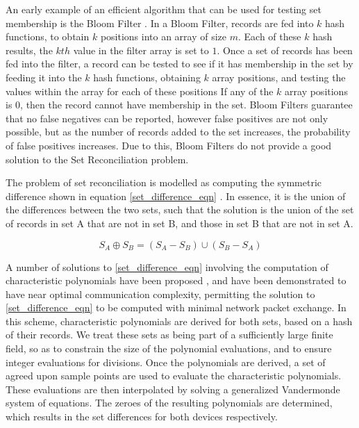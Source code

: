An early example of an efficient algorithm that can be used for testing set membership is the Bloom Filter \cite{RefWorks:7}.  In a Bloom Filter, records are fed into $k$ hash functions, to obtain $k$ positions into an array of size $m$.  Each of these $k$ hash results, the $kth$ value in the filter array is set to $1$.  Once a set of records has been fed into the filter, a record can be tested to see if it has membership in the set by feeding it into the $k$ hash functions, obtaining $k$ array positions, and testing the values within the array for each of these positions  If any of the $k$ array positions is $0$, then the record cannot have membership in the set.  Bloom Filters guarantee that no false negatives can be reported, however false positives are not only possible, but as the number of records added to the set increases, the probability of false positives increases.  Due to this, Bloom Filters do not provide a good solution to the Set Reconciliation problem.

The problem of set reconciliation is modelled as computing the symmetric difference shown in equation \ref{set_difference_eqn} \cite{RefWorks:17}.  In essence, it is the union of the differences between the two sets, such that the solution is the union of the set of records in set A that are not in set B, and those in set B that are not in set A.

\begin{equation}
S_A \oplus S_B = (S_A - S_B) \cup (S_B - S_A)
\label{set_difference_eqn}
\end{equation}

A number of solutions to \ref{set_difference_eqn} involving the computation of characteristic polynomials have been proposed \cite{RefWorks:17, RefWorks:2, RefWorks:24}, and have been demonstrated to have near optimal communication complexity, permitting the solution to \ref{set_difference_eqn} to be computed with minimal network packet exchange.  In this scheme, characteristic polynomials are derived for both sets, based on a hash of their records.  We treat these sets as being part of a sufficiently large finite field, so as to constrain the size of the polynomial evaluations, and to ensure integer evaluations for divisions.   Once the polynomials are derived, a set of agreed upon sample points are used to evaluate the characteristic polynomials.  These evaluations are then interpolated by solving a generalized Vandermonde system of equations.  The zeroes of the resulting polynomials are determined, which results in the set differences for both devices respectively.

